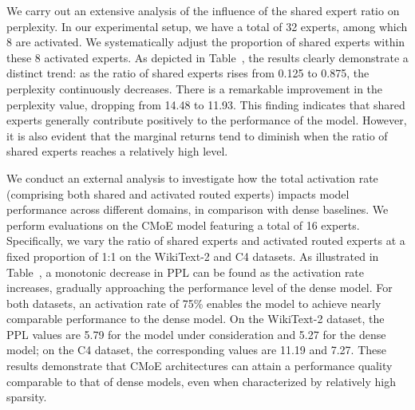 
We carry out an extensive analysis of the influence of the shared expert ratio on perplexity. In our experimental setup, we have a total of 32 experts, among which 8 are activated. We systematically adjust the proportion of shared experts within these 8 activated experts. As depicted in Table~, the results clearly demonstrate a distinct trend: as the ratio of shared experts rises from 0.125 to 0.875, the perplexity continuously decreases. There is a remarkable improvement in the perplexity value, dropping from 14.48 to 11.93. This finding indicates that shared experts generally contribute positively to the performance of the model. However, it is also evident that the marginal returns tend to diminish when the ratio of shared experts reaches a relatively high level.


We conduct an external analysis to investigate how the total activation rate (comprising both shared and activated routed experts) impacts model performance across different domains, in comparison with dense baselines. We perform evaluations on the CMoE model featuring a total of 16 experts. Specifically, we vary the ratio of shared experts and activated routed experts at a fixed proportion of 1:1 on the WikiText-2 and C4 datasets.
As illustrated in Table~, a monotonic decrease in PPL can be found as the activation rate increases, gradually approaching the performance level of the dense model. For both datasets, an activation rate of 75\% enables the model to achieve nearly comparable performance to the dense model. On the WikiText-2 dataset, the PPL values are 5.79 for the model under consideration and 5.27 for the dense model; on the C4 dataset, the corresponding values are 11.19 and 7.27. These results demonstrate that CMoE architectures can attain a performance quality comparable to that of dense models, even when characterized by relatively high sparsity.


